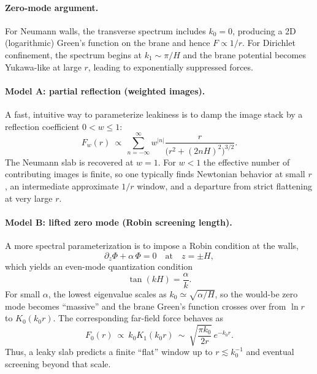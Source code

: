 \documentclass[12pt]{article}
\begin{document}
\paragraph{Zero-mode argument.}
For Neumann walls, the transverse spectrum includes $k_0=0$, producing a 2D (logarithmic) Green's function on the brane and hence $F\propto 1/r$. For Dirichlet confinement, the spectrum begins at $k_1\sim \pi/H$ and the brane potential becomes Yukawa-like at large $r$, leading to exponentially suppressed forces.

\paragraph{Model A: partial reflection (weighted images).}
A fast, intuitive way to parameterize leakiness is to damp the image stack by a reflection coefficient $0<w\le 1$:
\begin{equation}
  F_w(r)\ \propto\ \sum_{n=-\infty}^{\infty} w^{|n|}
  \frac{r}{\bigl(r^2+(2nH)^2\bigr)^{3/2}}.
  \label{eq:weighted-images}
\end{equation}
The Neumann slab is recovered at $w=1$. For $w<1$ the effective number of contributing images is finite, so one typically finds Newtonian behavior at small $r$, an intermediate approximate $1/r$ window, and a departure from strict flattening at very large $r$.

\paragraph{Model B: lifted zero mode (Robin screening length).}
A more spectral parameterization is to impose a Robin condition at the walls,
\begin{equation}
  \partial_z \Phi + \alpha\,\Phi = 0\quad\text{at}\quad z=\pm H,
\end{equation}
which yields an even-mode quantization condition
\begin{equation}
  \tan(kH)=\frac{\alpha}{k}.
  \label{eq:robin-quant}
\end{equation}
For small $\alpha$, the lowest eigenvalue scales as $k_0\simeq \sqrt{\alpha/H}$, so the would-be zero mode becomes ``massive'' and the brane Green's function crosses over from $\ln r$ to $K_0(k_0 r)$. The corresponding far-field force behaves as
\begin{equation}
  F_0(r)\ \propto\ k_0 K_1(k_0 r)\ \sim\ \sqrt{\frac{\pi k_0}{2r}}\,e^{-k_0 r}.
  \label{eq:screened-zero}
\end{equation}
Thus, a leaky slab predicts a finite ``flat'' window up to $r\lesssim k_0^{-1}$ and eventual screening beyond that scale.
\end{document}

